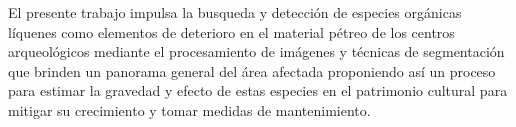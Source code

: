 \begin{resumen}
\noindent

El presente trabajo impulsa la busqueda y detección de especies orgánicas líquenes como elementos de deterioro en el material pétreo de los centros arqueológicos mediante el procesamiento de imágenes y técnicas de segmentación que brinden un panorama general del área afectada proponiendo así un proceso para estimar la gravedad y efecto de estas especies en el patrimonio cultural para mitigar su crecimiento y tomar medidas de mantenimiento.

\end{resumen}

